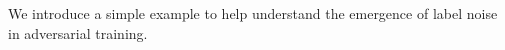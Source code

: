We introduce a simple example to help understand the emergence of label noise in adversarial training.
